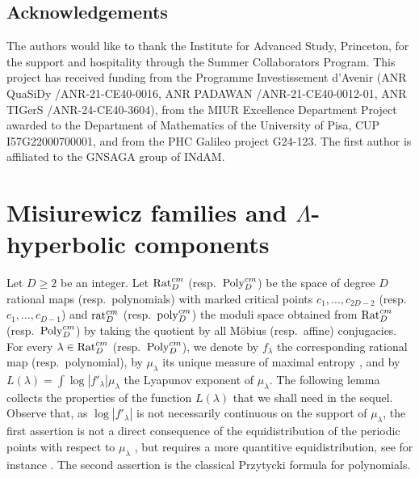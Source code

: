 \documentclass[11pt]{amsart}
\theoremstyle{plain}
\theoremstyle{definition}
\theoremstyle{remark}
\begin{document}
\subsection*{Acknowledgements}
The authors would like to thank the Institute for Advanced Study, Princeton,
for the support and  hospitality
through the Summer Collaborators Program.
This project has received funding from
 the
 Programme
 Investissement d'Avenir
(ANR QuaSiDy /ANR-21-CE40-0016,
ANR PADAWAN /ANR-21-CE40-0012-01,
ANR TIGerS /ANR-24-CE40-3604),
 from the MIUR Excellence Department Project awarded to the Department of Mathematics of the University of Pisa, CUP I57G22000700001,
 and
 from the PHC Galileo project G24-123.
The first
author is affiliated to the GNSAGA group of INdAM.



\section{Misiurewicz families and $\Lambda$-hyperbolic components}\label{sec_2}
Let $D\ge 2$ be an integer. Let ${\rm Rat}^{cm}_D$ (resp.\ ${\rm Poly}^{cm}_D$) be the space of degree $D$ rational maps (resp.\ polynomials) with marked critical points $c_1,
\ldots, c_{2D-2}$ (resp.\ $c_1, \ldots, c_{D-1}$) and ${\rm rat}^{cm}_D$ (resp.\ ${\rm poly}^{cm}_D$)
the moduli space obtained from ${\rm Rat}^{cm}_D$ (resp.\
${\rm Poly}^{cm}_D$) by taking the quotient by all M\"obius 
(resp.\ affine)
conjugacies. For every 
$\lambda \in {\rm Rat}^{cm}_D$ (resp.\ ${\rm Poly}^{cm}_D$), we denote by $f_\lambda$ the corresponding 
rational map (resp.\ polynomial),
by $\mu_\lambda$ its unique measure of maximal entropy \cite{FLM83,Lyubich82,Lyu83entropy}, and by $L(\lambda) = \int \log |f'_\lambda|\mu_\lambda$ the Lyapunov exponent of $\mu_\lambda$. The following lemma collects the properties of the function $L(\lambda)$ that we shall need in the sequel.  Observe
that, as $\log |f'_\lambda|$ is not necessarily continuous on the support of $\mu_\lambda$, the first assertion is not a direct
consequence of the equidistribution of the periodic 
points with respect to $\mu_\lambda$ \cite{Lyubich82}, but requires a more quantitive equidistribution, see 
for instance \cite{BDM,BD19}.
The second
assertion is the classical Przytycki formula
\cite{Przytycki85} for polynomials.
\end{document}
